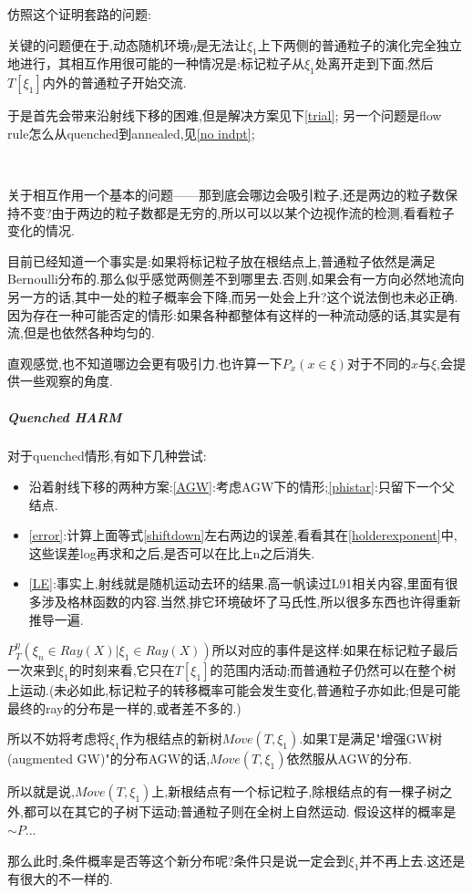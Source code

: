 \documentclass[a4paper,oneside]{ctexbook}
\begin{document}
				仿照这个证明套路的问题:

				关键的问题便在于,动态随机环境$\eta$是无法让$\xi_1$上下两侧的普通粒子的演化完全独立地进行，其相互作用很可能的一种情况是:标记粒子从$\xi_1$处离开走到下面,然后$T[\xi_1]$内外的普通粒子开始交流.

				于是首先会带来沿射线下移的困难,但是解决方案见下\ref{trial};
				另一个问题是flow rule怎么从quenched到annealed,见\ref{no indpt};

				\begin{que}
					\label{flow}
					\ 

					关于相互作用一个基本的问题——那到底会哪边会吸引粒子,还是两边的粒子数保持不变?由于两边的粒子数都是无穷的,所以可以以某个边视作流的检测,看看粒子变化的情况.

					目前已经知道一个事实是:如果将标记粒子放在根结点上,普通粒子依然是满足Bernoulli分布的.那么似乎感觉两侧差不到哪里去.否则,如果会有一方向必然地流向另一方的话,其中一处的粒子概率会下降,而另一处会上升?这个说法倒也未必正确.因为存在一种可能否定的情形:如果各种都整体有这样的一种流动感的话,其实是有流,但是也依然各种均匀的.

					直观感觉,也不知道哪边会更有吸引力.也许算一下$P_x(x\in \xi)$对于不同的$x$与$\xi$,会提供一些观察的角度.

				\end{que}



				\subparagraph*{Quenched HARM}
				\quad

					对于quenched情形,有如下几种尝试:

					\begin{itemize}
						\label{trial}
						\item 沿着射线下移的两种方案:\ref{AGW}:考虑AGW下的情形;\ref{phistar}:只留下一个父结点.
						\item \ref{error}:计算上面等式\ref{shiftdown}左右两边的误差,看看其在\ref{holderexponent}中,这些误差log再求和之后,是否可以在比上n之后消失.
						\item \ref{LE}:事实上,射线就是随机运动去环的结果.高一帆读过L91相关内容,里面有很多涉及格林函数的内容.当然,排它环境破坏了马氏性,所以很多东西也许得重新推导一遍.
					\end{itemize}

					\begin{tri}[考虑AGW下的情形]
						\label{AGW}
						$P^{\eta}_T( \xi_n \in Ray(X) | \xi_1 \in Ray(X))$所以对应的事件是这样:如果在标记粒子最后一次来到$\xi_1$的时刻来看,它只在$T[\xi_1]$的范围内活动;而普通粒子仍然可以在整个树上运动.(未必如此,标记粒子的转移概率可能会发生变化,普通粒子亦如此;但是可能最终的ray的分布是一样的,或者差不多的.)

						所以不妨将考虑将$\xi_1$作为根结点的新树$Move(T,\xi_1)$.如果T是满足"增强GW树(augmented GW)"的分布AGW的话,$Move(T,\xi_1)$依然服从AGW的分布.

						所以就是说,$Move(T,\xi_1)$上,新根结点有一个标记粒子,除根结点的有一棵子树之外,都可以在其它的子树下运动;普通粒子则在全树上自然运动.
						假设这样的概率是$\sim{P}$...

						那么此时,条件概率是否等这个新分布呢?条件只是说一定会到$\xi_1$并不再上去.这还是有很大的不一样的.
					\end{tri}
\end{document}
